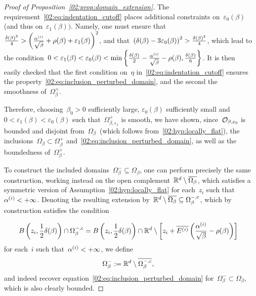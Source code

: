 \begin{proof}[Proof of Proposition~\ref{02:prop:domain_extension}]
        The requirement~\eqref{02:eq:indentation_cutoff} places additional constraints on~$\varepsilon_0(\beta)$ (and thus on~$\varepsilon_1(\beta))$. Namely, one must ensure that
        $\frac{\delta(\beta)^2}4>\left(\frac{\alpha^{(i)}}{\sqrt\beta}+\rho(\beta)+\varepsilon_1(\beta)\right)^2$, and that~$\left(\delta(\beta)-3\varepsilon_0(\beta)\right)^2 >\frac{\delta(\beta)^2}4$, which lead to the condition~$0<\varepsilon_1(\beta)<\varepsilon_0(\beta) < \min\left\{\frac{\delta(\beta)}{2}-\frac{\alpha^{(i)}}{\sqrt\beta}-\rho(\beta),\frac{\delta(\beta)}{6}\right\}$.
        It is then easily checked that the first condition on~$\eta$ in~\eqref{02:eq:indentation_cutoff} ensures the property~\eqref{02:eq:inclusion_perturbed_domain}, and the second the smoothness of~$\Omega_\beta^+$.

        Therefore, choosing~$\beta_0>0$ sufficiently large, $\varepsilon_0(\beta)$ sufficiently small and~$0<\varepsilon_1(\beta)<\varepsilon_0(\beta)$ such that~$\Omega_{\beta,\varepsilon_1}^+$ is smooth,  we have shown, since~$\mathcal{O}_{\beta,\varepsilon_0}$ is bounded and disjoint from~$\Omega_\beta$~(which follows from~\eqref{02:hyp:locally_flat}), the inclusions~$\Omega_\beta \subset \Omega_\beta^+$ and~\eqref{02:eq:inclusion_perturbed_domain}, as well as the boundedness of~$\Omega_\beta^+$.

        To construct the included domains~$\Omega_\beta^-\subseteq \Omega_\beta$, one can perform precisely the same construction, working instead on the open complement~$\mathbb{R}^d\setminus \overline{\Omega_\beta}$, which satisfies a symmetric version of Assumption~\eqref{02:hyp:locally_flat} for each~$z_i$ such that~$\alpha^{(i)}<+\infty$. Denoting the resulting extension by~$\mathbb{R}^d\setminus\overline{\Omega_\beta}\subseteq\Omega_\beta^{-,\mathrm{c}}$, which by construction satisfies the condition

        $$B\left(z_i,\frac12\delta(\beta)\right)\cap \Omega_\beta^{-,\mathrm{c}}= B\left(z_i,\frac12\delta(\beta)\right)\cap\mathbb{R}^d\setminus\left[z_i+\overline{E^{(i)}}\left(\frac{\alpha^{(i)}}{\sqrt\beta}-\rho(\beta)\right)\right]$$
        for each~$i$ such that~$\alpha^{(i)}<+\infty$, we define
        \[\Omega_\beta^{-} := \mathbb{R}^d\setminus \overline{\Omega_\beta^{-,\mathrm{c}}},\]
        and indeed recover equation~\eqref{02:eq:inclusion_perturbed_domain} for~$\Omega_\beta^{-}\subset\Omega_\beta$, which is also clearly bounded.
    \end{proof}

